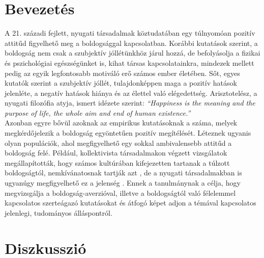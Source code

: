 \section*{Bevezetés}
A 21. századi fejlett, nyugati társadalmak köztudatában egy túlnyomóan pozitív attitűd figyelhető meg a boldogsággal kapcsolatban. Korábbi kutatások szerint, a boldogság nem csak a szubjektív jóllétünkhöz járul hozzá, de befolyásolja a fizikai és pszichológiai egészségünket is, kihat társas kapcsolatainkra, mindezek mellett pedig az egyik legfontosabb motiváló erő számos ember életében. Sőt, egyes kutatók szerint a szubjektív jóllét, tulajdonképpen maga a pozitív hatások jelenléte, a negatív hatások hiánya és az élettel való elégedettség.\cite{diener_suh_lucas_smith_1999} Arisztotelész, a nyugati filozófia atyja, ismert idézete szerint: \textit{“Happiness is the meaning and the purpose of life, the whole aim and end of human existence.”} \medskip 
\\ Azonban egyre bővül azoknak az empirikus kutatásoknak a száma, melyek megkérdő\-jelezik  a boldogság egyöntetűen pozitív megítélését. Léteznek ugyanis olyan populációk, ahol megfigyelhető egy sokkal ambivalensebb attitűd a boldogság felé. Például, kollektivista társadalmakon végzett vizsgálatok megállapították, hogy számos kultúrá\-ban kifejezetten tartanak a túlzott boldogságtól, nemkívánatosnak tartják azt \cite{joshanloo_weijers_2013} \cite{joshanloo_lepshokova_panyusheva_natalia_poon_yeung_sundaram_achoui_asano_igarashi}, de a nyugati társadalmakban is ugyanúgy megfigyelhető ez a jelenség \cite{gilbert_mcewan_catarino_baiao_palmeira_2013}.  Ennek a tanulmánynak a célja, hogy megvizsgálja a boldogság-averzióval, illetve a boldogságtól való félelemmel kapcsolatos szerteágazó kutatásokat és átfogó képet adjon a témával kapcsolatos jelenlegi, tudományos álláspontról. \medskip 

\pagebreak
\section* {Diszkusszió}
